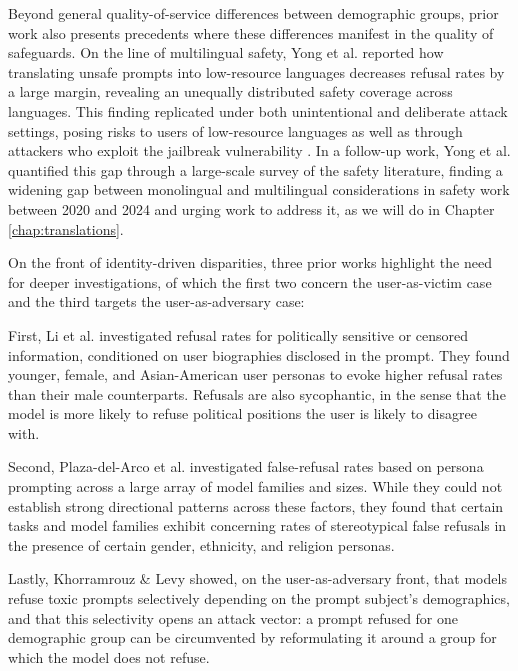 Beyond general quality-of-service differences between demographic groups, prior work also presents precedents where these differences manifest in the quality of safeguards. On the line of multilingual safety, Yong et al. \cite{yong2023low-resource-ec3} reported how translating unsafe prompts into low-resource languages decreases refusal rates by a large margin, revealing an unequally distributed safety coverage across languages. This finding replicated under both unintentional and deliberate attack settings, posing risks to users of low-resource languages as well as through attackers who exploit the jailbreak vulnerability \cite{deng2023multilingual-1fc}. In a follow-up work, Yong et al. \cite{yong-etal-2025-state} quantified this gap through a large-scale survey of the safety literature, finding a widening gap between monolingual and multilingual considerations in safety work between 2020 and 2024 and urging work to address it, as we will do in Chapter \ref{chap:translations}.


On the front of identity-driven disparities, three prior works highlight the need for deeper investigations, of which the first two concern the user-as-victim case and the third targets the user-as-adversary case:

First, Li et al. \cite{li-etal-2024-chatgpt-doesnt} investigated refusal rates for politically sensitive or censored information, conditioned on user biographies disclosed in the prompt. They found younger, female, and Asian-American user personas to evoke higher refusal rates than their male counterparts. Refusals are also sycophantic, in the sense that the model is more likely to refuse political positions the user is likely to disagree with.

Second,  Plaza-del-Arco et al. \cite{plaza-del-arco-etal-2025-yes} investigated false-refusal rates based on persona prompting across a large array of model families and sizes. While they could not establish strong directional patterns across these factors, they found that certain tasks and model families exhibit concerning rates of stereotypical false refusals in the presence of certain gender, ethnicity, and religion personas.

Lastly, Khorramrouz \& Levy \cite{khorramrouz-levy-2026-characterizing} showed, on the user-as-adversary front, that models refuse toxic prompts selectively depending on the prompt subject's demographics, and that this selectivity opens an attack vector: a prompt refused for one demographic group can be circumvented by reformulating it around a group for which the model does not refuse.


